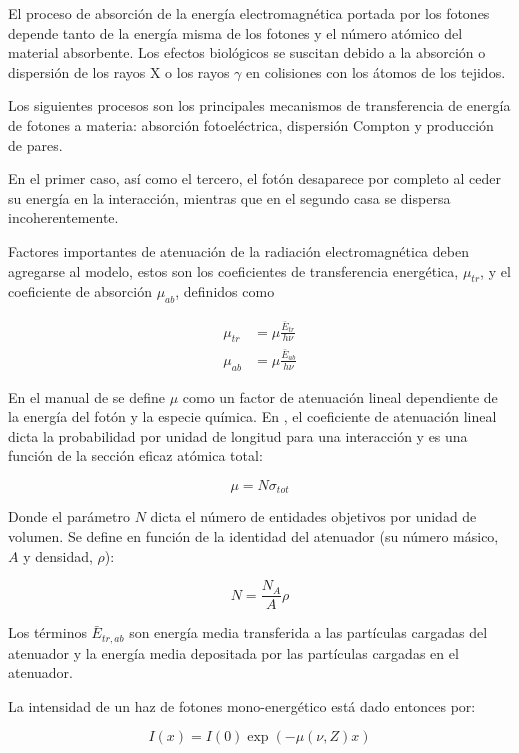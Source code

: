 \documentclass[12pt,letterpaper, oneside]{book}
\begin{document}
	El proceso de absorción de la energía electromagnética portada por los fotones depende tanto de la energía misma de los fotones y el número atómico del material absorbente\cite{IAEA.2010}. Los efectos biológicos se suscitan debido a la absorción o dispersión de los rayos X o los rayos $\gamma$ en colisiones con los átomos de los tejidos\cite{IAEA.2010, Mayles.2007}. 
	
	Los siguientes procesos son los principales mecanismos de transferencia de energía de fotones a materia: absorción fotoeléctrica, dispersión Compton y producción de pares\cite{IAEA.2010}. 
	
	En el primer caso, así como el tercero, el fotón desaparece por completo al ceder su energía en la interacción, mientras que en el segundo casa se dispersa incoherentemente\cite{IAEA.2005}.
	
	Factores importantes de atenuación de la radiación electromagnética deben agregarse al modelo, estos son los coeficientes de transferencia energética, $\mu_{tr}$, y el coeficiente de absorción $\mu_{ab}$, definidos como
	
	\begin{eqnarray}
		\mu_{tr}&=\mu \frac{\bar{E}_{tr}}{h\nu}\\
		\mu_{ab}&=\mu \frac{\bar{E}_{ab}}{h\nu}
	\end{eqnarray}
	 
	 En el manual de \cite{IAEA.2005} se define $\mu$ como un factor de atenuación lineal dependiente de la energía del fotón y la especie química. En \cite{Mayles.2007}, el coeficiente de atenuación lineal dicta la probabilidad por unidad de longitud para una interacción y es una función de la sección eficaz atómica total:
	 
	 $$\mu=N \sigma_{tot}$$
	 
	 Donde el parámetro $N$ dicta el número de entidades objetivos por unidad de volumen. Se define en función de la identidad del atenuador (su número másico, $A$ y densidad, $\rho$):
	 
	 $$N=\frac{N_A}{A}\rho$$	 
	 
	 Los términos $\bar{E}_{tr, ab}$ son energía media transferida a las partículas cargadas del atenuador y la energía media depositada por las partículas cargadas en el atenuador. 
	 
	 La intensidad de un haz de fotones mono-energético está dado entonces por:
	 
	 \begin{equation}
	 	I(x)=I(0)\exp(-\mu(\nu, Z)x)\label{photon_beam_intensity}
	 \end{equation}
	 
\end{document}
